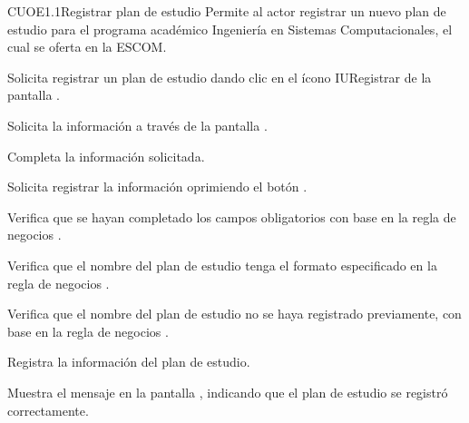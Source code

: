 \begin{UseCase}{CUOE1.1}{Registrar plan de estudio}{	
	Permite al actor registrar un nuevo plan de estudio para el programa académico Ingeniería en Sistemas Computacionales, el cual se oferta en la ESCOM.
}
{\begin{UClist}
		\end{UClist}
	}
\end{UseCase}

\begin{UCtrayectoria}
	\UCpaso [\UCactor] Solicita registrar un plan de estudio dando clic en el ícono IURegistrar de la pantalla . 
	
	\UCpaso[\UCsist] Solicita la información a través de la pantalla .
	
	\UCpaso [\UCactor] Completa la información solicitada. \label{CUOE1.1:CompletaInfo}
	
	\UCpaso [\UCactor] Solicita registrar la información oprimiendo el botón . 
	
	\UCpaso [\UCsist] Verifica que se hayan completado los campos obligatorios con base en la regla de negocios . 
	
	\UCpaso [\UCsist] Verifica que el nombre del plan de estudio tenga el formato especificado en la regla de negocios . 
	
	\UCpaso [\UCsist] Verifica que el nombre del plan de estudio no se haya registrado previamente, con base en la regla de negocios . 
			
	\UCpaso [\UCsist] Registra la información del plan de estudio.
	
	\UCpaso [\UCsist] Muestra el mensaje  en la pantalla , indicando que el plan de estudio se registró correctamente.	
	
\end{UCtrayectoria}

